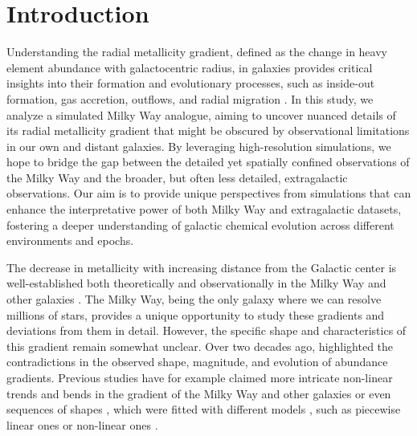 \documentclass[fleqn,usenatbib]{mnras}
\begin{document}
\section{Introduction}
\label{sec:intro}

Understanding the radial metallicity gradient, defined as the change in heavy element abundance with galactocentric radius, in galaxies provides critical insights into their formation and evolutionary processes, such as inside-out formation, gas accretion, outflows, and radial migration \citep[e.g.][]{Quirk1973, Tinsley1980, Lacey1985, Wyse1989, Kauffman1996, Chiappini1997, Schoenrich2009b, Moran2012, Bird2013}. In this study, we analyze a simulated Milky Way analogue, aiming to uncover nuanced details of its radial metallicity gradient that might be obscured by observational limitations in our own and distant galaxies. By leveraging high-resolution simulations, we hope to bridge the gap between the detailed yet spatially confined observations of the Milky Way and the broader, but often less detailed, extragalactic observations. Our aim is to provide unique perspectives from simulations that can enhance the interpretative power of both Milky Way and extragalactic datasets, fostering a deeper understanding of galactic chemical evolution across different environments and epochs.

The decrease in metallicity with increasing distance from the Galactic center is well-established both theoretically \citep{Larson1976, Tinsley1980, Chiosi1980} and observationally in the Milky Way \citep{Searle1971, Janes1979, Twarog1997} and other galaxies \citep[e.g.][]{Tinsley1980, Zaritsky1994,Bresolin2012}. The Milky Way, being the only galaxy where we can resolve millions of stars, provides a unique opportunity to study these gradients and deviations from them in detail. However, the specific shape and characteristics of this gradient remain somewhat unclear. Over two decades ago, \citet{Chiappini2002} highlighted the contradictions in the observed shape, magnitude, and evolution of abundance gradients. Previous studies have for example claimed more intricate non-linear trends and bends in the gradient of the Milky Way \citep[e.g.][]{Donor2020} and other galaxies \citep[e.g.][]{Pilyugin2003} or even sequences of shapes \citep{Pilyugin2017, Pilyugin2024}, which were fitted with different models \citep{RosalesOrtega2011, Bresolin2012}, such as piecewise linear ones \citep[e.g.][]{SanchezMenguiano2016} or non-linear ones \citep[e.g.][]{Scarano2013}.
\end{document}
